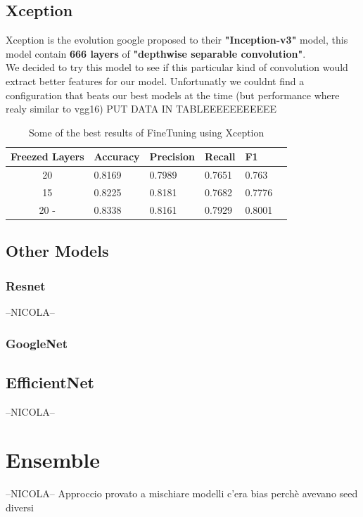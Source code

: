 \documentclass[10pt]{article}
\begin{document}
\subsection{Xception}
Xception is the evolution google proposed to their \textbf{"Inception-v3"} model, this model contain \textbf{666 layers} of \textbf{"depthwise separable convolution"}.\\
We decided to try this model to see if this particular kind of convolution would extract better features for our model.
Unfortunatly we couldnt find a configuration that beats our best models at the time (but performance where realy similar to vgg16)
PUT DATA IN TABLEEEEEEEEEEE
\begin{table}[ht]
  \centering
  \begin{adjustbox}{width=240}
  \small
  \begin{tabular}{|c|l|l|l|l|l}
  
  \hline \bf Freezed Layers & \bf Accuracy & \bf Precision & \bf Recall & \bf F1 \\ \hline
  20 & 0.8169 & 0.7989 & 0.7651 & 0.763\\
  15 & 0.8225 & 0.8181 & 0.7682 & 0.7776\\
  20 -\> 1 & 0.8338 & 0.8161 & 0.7929 & 0.8001\\
  \hline
  \end{tabular}
  \end{adjustbox}
  \caption{Some of the best results of FineTuning using Xception}
  \end{table}
\subsection{Other Models}
\subsubsection{Resnet}
--NICOLA--
\subsubsection{GoogleNet}
\subsection{EfficientNet}
--NICOLA--



\section{Ensemble}
--NICOLA--
Approccio
provato a mischiare modelli
          c'era bias perchè avevano seed diversi
\end{document}
